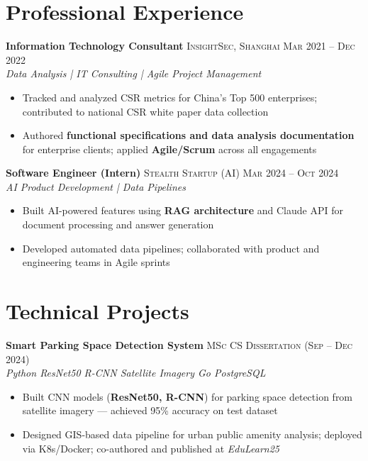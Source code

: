 \documentclass{simpleresume}
\begin{document}
\section{Professional Experience}
\noindent\textbf{Information Technology Consultant}
  \hfill{\sffamily\scshape\small\color{secondary}InsightSec, Shanghai}
  \hfill{\sffamily\scshape\small\color{muted}Mar 2021 -- Dec 2022}\\
  {\itshape\color{secondary}Data Analysis | IT Consulting | Agile Project Management}
\vspace{-0.25mm}
\begin{itemize}
  \item Tracked and analyzed CSR metrics for China's Top 500 enterprises; contributed to national CSR white paper data collection
  \item Authored \textbf{functional specifications and data analysis documentation} for enterprise clients; applied \textbf{Agile/Scrum} across all engagements
\end{itemize}

\vspace{0.05cm}
\noindent\textbf{Software Engineer (Intern)}
  \hfill{\sffamily\scshape\small\color{secondary}Stealth Startup (AI)}
  \hfill{\sffamily\scshape\small\color{muted}Mar 2024 -- Oct 2024}\\
  {\itshape\color{secondary}AI Product Development | Data Pipelines}
\vspace{-0.25mm}
\begin{itemize}
  \item Built AI-powered features using \textbf{RAG architecture} and Claude API for document processing and answer generation
  \item Developed automated data pipelines; collaborated with product and engineering teams in Agile sprints
\end{itemize}

\section{Technical Projects}
\noindent\textbf{Smart Parking Space Detection System}
  \hfill{\sffamily\scshape\small\color{muted}MSc CS Dissertation (Sep -- Dec 2024)}\\
  {\itshape\color{accent}\footnotesize Python \quad\textbullet\quad ResNet50 \quad\textbullet\quad R-CNN \quad\textbullet\quad Satellite Imagery \quad\textbullet\quad Go \quad\textbullet\quad PostgreSQL}
\vspace{-0.25mm}
\begin{itemize}
  \item Built CNN models (\textbf{ResNet50, R-CNN}) for parking space detection from satellite imagery --- achieved 95\% accuracy on test dataset
  \item Designed GIS-based data pipeline for urban public amenity analysis; deployed via K8s/Docker; co-authored and published at \textit{EduLearn25}
\end{itemize}
\end{document}
